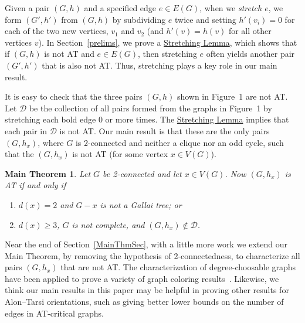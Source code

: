 \documentclass[12pt]{article}
\theoremstyle{plain}
\newtheorem*{mainthm}{Main Theorem}
\theoremstyle{definition}
\theoremstyle{remark}
\newcommand{\fancy}[1]{\mathcal{#1}}
\newcommand{\D}{\fancy{D}}
\def\D{\fancy{D}}
\begin{document}
Given a pair $(G,h)$ and a specified edge $e\in E(G)$, when we \emph{stretch
$e$}, we form $(G',h')$ from $(G,h)$ by subdividing $e$ twice and
setting $h'(v_i)=0$ for each of the two new vertices, $v_1$ and $v_2$ (and
$h'(v)=h(v)$ for all other vertices $v$).  
In Section~\ref{prelims}, we prove
a \hyperref[SubdivideTwice]{Stretching Lemma}, which shows that if $(G,h)$ is not AT and $e\in E(G)$, then
stretching $e$ often yields another pair $(G',h')$ that is also not AT. 
Thus, stretching plays a key role in our main result.

It is easy to check that the three pairs $(G,h)$ shown in Figure~1 are not AT.
Let $\D$ be the collection of all pairs formed from the graphs in Figure~1 by
stretching each bold edge 0 or more times.  The
\hyperref[SubdivideTwice]{Stretching Lemma} implies that
each pair in $\D$ is not AT.  Our main result is that these are the only
pairs $(G,h_x)$, where $G$ is 2-connected and neither a clique nor an
odd cycle, such that the $(G,h_x)$ is not AT (for some vertex $x\in V(G)$).  

\begin{mainthm}
Let $G$ be 2-connected and let $x \in V(G)$.
Now $(G,h_x)$ is AT if and only if
\begin{enumerate}
\item $d(x)=2$ and $G-x$ is not a Gallai tree; or
\item $d(x)\ge 3$, $G$ is not complete, and $(G,h_x) \not \in \D$.
\end{enumerate}
\end{mainthm}

Near the end of Section~\ref{MainThmSec}, with a little more work we extend our
Main Theorem, by removing the hypothesis of 2-connectedness, to characterize
all pairs $(G,h_x)$ that are not AT.
The characterization of degree-choosable graphs have been applied
to prove a variety of graph coloring
results~\cite{BohmeMS, CranstonPTV, KostochkaS, KralS, Thomassen-surface}. 
Likewise, we think our main results in this paper may be helpful in proving
other results for Alon--Tarsi orientations, such as giving better lower bounds
on the number of edges in AT-critical graphs.
\end{document}
